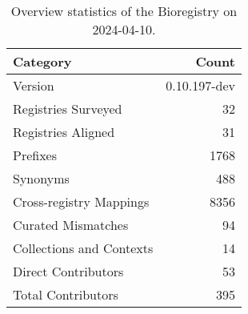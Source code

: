 \begin{table}
\caption{Overview statistics of the Bioregistry on 2024-04-10.}
\label{tab:bioregistry-summary}
\begin{tabular}{lr}
\toprule
Category & Count \\
\midrule
Version & 0.10.197-dev \\
Registries Surveyed & 32 \\
Registries Aligned & 31 \\
Prefixes & 1768 \\
Synonyms & 488 \\
Cross-registry Mappings & 8356 \\
Curated Mismatches & 94 \\
Collections and Contexts & 14 \\
Direct Contributors & 53 \\
Total Contributors & 395 \\
\bottomrule
\end{tabular}
\end{table}
